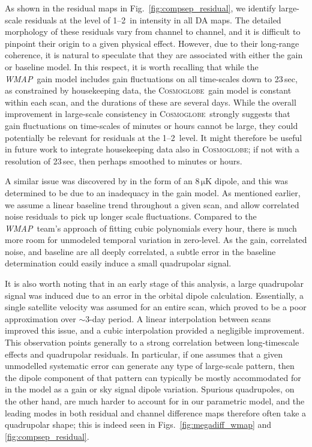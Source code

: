 \documentclass[twocolumn]{../../common/aa}
\def\WMAP{\emph{WMAP}}
\newcommand{\cosmoglobe}{\textsc{Cosmoglobe}}
\begin{document}
\label{sec:quadres}

As shown in the residual maps in Fig.~\ref{fig:compsep_residual}, we identify large-scale residuals at the level of 1--2\muK\ in intensity in all DA maps. The detailed morphology of these residuals vary from channel to channel, and it is difficult to pinpoint their origin to a given physical effect. However, due to their long-range coherence, it is natural to speculate that they are associated with either the gain or baseline model. In this respect, it is worth recalling that while the \WMAP\ gain model includes gain fluctuations on all time-scales down to 23\,sec, as constrained by housekeeping data, the \cosmoglobe\ gain model is constant within each scan, and the durations of these are several days. While the overall improvement in large-scale consistency in \cosmoglobe\ strongly suggests that gain fluctuations on time-scales of minutes or hours cannot be large, they could potentially be relevant for residuals at the 1--2\muK\ level. It might therefore be useful in future work to integrate housekeeping data also in \cosmoglobe; if not with a resolution of 23\,sec, then perhaps smoothed to minutes or hours.

A similar issue was discovered by \citet{jarosik2007} in the form of an $8\,\mathrm{\mu K}$ dipole, and this was determined to be due to an inadequacy in the gain model. As mentioned earlier, we assume a linear baseline trend throughout a given scan, and allow correlated noise residuals to pick up longer scale fluctuations. Compared to the \WMAP\ team's approach of fitting cubic polynomials every hour, there is much more room for unmodeled temporal variation in zero-level. As the gain, correlated noise, and baseline are all deeply correlated, a subtle error in the baseline determination could easily induce a small quadrupolar signal.

It is also worth noting that in an early stage of this analysis, a large quadrupolar signal was induced due to an error in the orbital dipole calculation. Essentially, a single satellite velocity was assumed for an entire scan, which proved to be a poor approximation over $\sim$$3$-day period. A linear interpolation between scans improved this issue, and a cubic interpolation provided a negligible improvement. This observation points generally to a strong correlation between long-timescale effects and quadrupolar residuals. In particular, if one assumes that a given unmodelled systematic error can generate any type of large-scale pattern, then the dipole component of that pattern can typically be mostly accommodated for in the model as a gain or sky signal dipole variation. Spurious quadrupoles, on the other hand, are much harder to account for in our parametric model, and the leading modes in both residual and channel difference maps therefore often take a quadrupolar shape; this is indeed seen in Figs.~\ref{fig:megadiff_wmap} and \ref{fig:compsep_residual}. 
\end{document}
